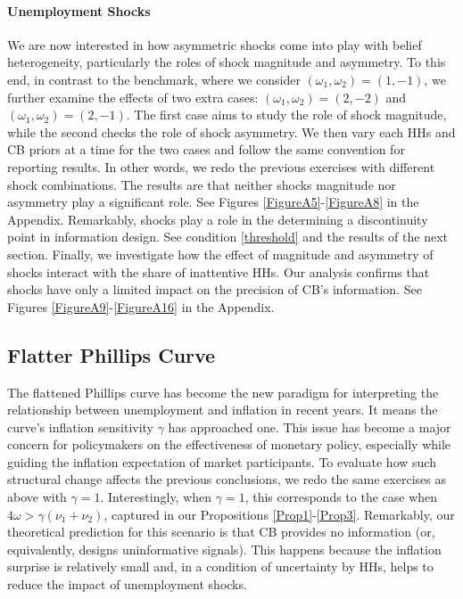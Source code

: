 \documentclass[12pt,a4paper]{article}
\begin{document}
\paragraph{Unemployment Shocks}
We are now interested in how asymmetric shocks come into play with belief heterogeneity, particularly the roles of shock magnitude and asymmetry. To this end, in contrast to the benchmark, where we consider $(\omega_1,\omega_2)=(1,-1)$, we further examine the effects of two extra cases: $(\omega_1,\omega_2)=(2,-2)$ and $(\omega_1,\omega_2)=(2,-1)$. The first case aims to study the role of shock magnitude, while the second checks the role of shock asymmetry. We then vary each HHs and CB priors at a time for the two cases and follow the same convention for reporting results. In other words, we redo the previous exercises with different shock combinations. The results are that neither shocks magnitude nor asymmetry play a significant role.
See Figures \ref{FigureA5}-\ref{FigureA8} in the Appendix. Remarkably, shocks play a role in the determining a discontinuity point in information design. See condition \eqref{threshold} and the results of the next section. Finally, we investigate how the effect of magnitude and asymmetry of shocks interact with the share of inattentive HHs. Our analysis confirms that shocks have only a limited impact on the precision of CB's information. See Figures \ref{FigureA9}-\ref{FigureA16} in the Appendix.


\subsection{Flatter Phillips Curve}
The flattened Phillips curve has become the new paradigm for interpreting the relationship between unemployment and inflation in recent years. It means the curve's inflation sensitivity $\gamma$ has approached one. This issue has become a major concern for policymakers on the effectiveness of monetary policy, especially while guiding the inflation expectation of market participants. To evaluate how such structural change affects the previous conclusions, we redo the same exercises as above with $\gamma=1$. Interestingly, when $\gamma=1$, this corresponds to the case when $4\omega > \gamma (\nu_1 + \nu_2)$, captured in our Propositions \ref{Prop1}-\ref{Prop3}. Remarkably, our theoretical prediction for this scenario is that CB provides no information (or, equivalently, designs uninformative signals). This happens because the inflation surprise is relatively small and, in a condition of uncertainty by HHs, helps to reduce the impact of unemployment shocks. 
\end{document}
